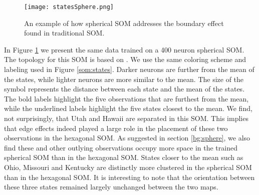 \begin{figure}[h]
\centering
\texttt{[image: statesSphere.png]}
\caption{An example of how spherical SOM addresses the boundary effect found in
traditional SOM.}
\label{sphere:states}
\end{figure}

In Figure \ref{sphere:states} we present the same data trained on a 400 neuron
spherical SOM.  The topology for this SOM is based on \cite{Rakhmanov94}.  We
use the same coloring scheme and labeling used in Figure \ref{som:states}.
Darker neurons are further from the mean of the states, while lighter neurons
are more similar to the mean.  The size of the symbol represents the distance
between each state and the mean of the states.  The bold labels highlight the
five observations that are furthest from the mean, while the underlined labels
highlight the five states closest to the mean.  We find, not surprisingly, that
Utah and Hawaii are separated in this SOM.  This implies that edge effects indeed
played a large role in the placement of these two observations in the hexagonal
SOM.  As suggested in section \ref{bg:sphere}, we also find these and other
outlying observations occupy more space in the trained spherical SOM than in
the hexagonal SOM.  States closer to the mean such as Ohio, Missouri and
Kentucky are distinctly more clustered in the spherical SOM than in
the hexagonal SOM.  It is interesting to note that the orientation between
these three states remained largely unchanged between the two maps.

